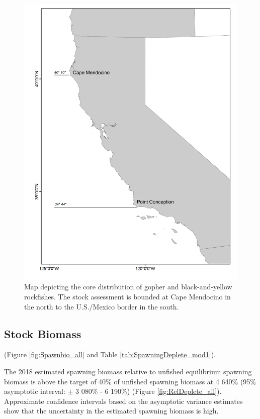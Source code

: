 \documentclass[12pt,]{article}
\begin{document}
\begin{figure}
\centering
\includegraphics{Figures/assess_region_map.png}
\caption{Map depicting the core distribution of gopher and
black-and-yellow rockfishes. The stock assessment is bounded at Cape
Mendocino in the north to the U.S./Mexico border in the south.
\label{fig:assess_region_map}}
\end{figure}

\FloatBarrier

\subsection*{Stock Biomass}\label{stock-biomass}

(Figure \ref{fig:Spawnbio_all} and Table
\ref{tab:SpawningDeplete_mod1}).

The 2018 estimated spawning biomass relative to unfished equilibrium
spawning biomass is above the target of 40\% of unfished spawning
biomass at 4 640\% (95\% asymptotic interval: \(\pm\) 3 080\% - 6 190\%)
(Figure \ref{fig:RelDeplete_all}). Approximate confidence intervals
based on the asymptotic variance estimates show that the uncertainty in
the estimated spawning biomass is high.
\end{document}

